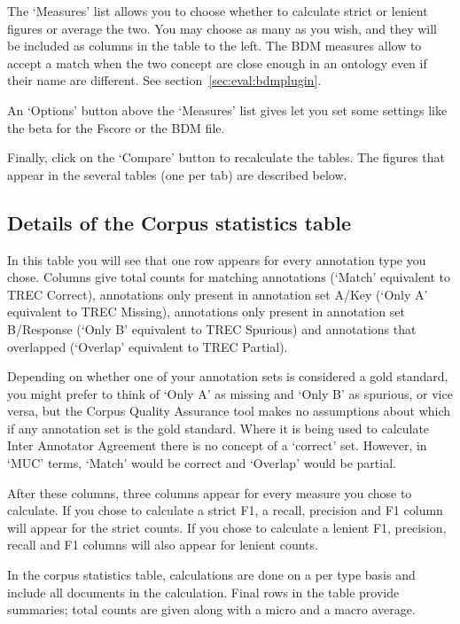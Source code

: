 The `Measures' list allows you to choose whether to calculate strict or lenient
figures or average the two. You may choose as many as you wish, and they will
be included as columns in the table to the left. The BDM measures allow to
accept a match when the two concept are close enough in an ontology even if
their name are different. See section~\ref{sec:eval:bdmplugin}.

An `Options' button above the `Measures' list gives let you set some
settings like the beta for the Fscore or the BDM file.

Finally, click on the `Compare' button to recalculate the tables. The figures
that appear in the several tables (one per tab) are described below.

\subsection{Details of the Corpus statistics table}

In this table you will see that one row appears for every annotation type
you chose. Columns give total counts for matching annotations (`Match'
equivalent to TREC Correct), annotations only present in annotation set
A/Key (`Only A' equivalent to TREC Missing), annotations only present in
annotation set B/Response (`Only B' equivalent to TREC Spurious) and
annotations that overlapped (`Overlap' equivalent to TREC Partial).

Depending on whether one of your annotation sets is considered a
gold standard, you might prefer to think of `Only A' as missing and `Only B' as
spurious, or vice versa, but the Corpus Quality Assurance tool makes no
assumptions about which if any annotation set is the gold standard. Where it is
being used to calculate Inter Annotator Agreement there is no concept of a
`correct' set. However, in `MUC' terms, `Match' would be correct and `Overlap'
would be partial.

After these columns, three columns appear for every measure
you chose to calculate. If you chose to calculate a strict F1, a recall,
precision and F1 column will appear for the strict counts. If you chose to
calculate a lenient F1, precision, recall and F1 columns will also appear for
lenient counts.

In the corpus statistics table, calculations are done on a per type
basis and include all documents in the calculation. Final rows in the table
provide summaries; total counts are given along with a micro and a macro average.

